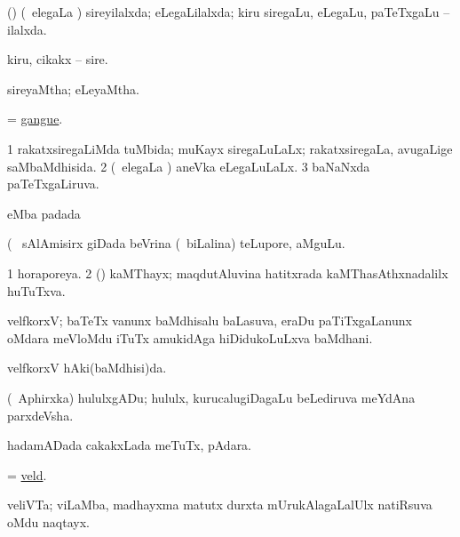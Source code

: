 \bentry
{} 
\gl{\gu}
\expl{}
\bmng
 (\savi) (\kanmu\ elegaLa \vi) sireyilalxda; eLegaLilalxda; kiru siregaLu, eLegaLu, paTeTxgaLu -- ilalxda. 
\emng
\eentry

\bentry
{} 
\gl{\nA}
\expl{}
\bmng
 kiru, cikakx -- sire. 
\emng
\eentry

\bentry
{} 
\gl{\gu}
\expl{}
\bmng
 sireyaMtha; eLeyaMtha. 
\emng
\eentry

\bentry
{} 
\gl{\nA}
\expl{}
\bmng
 = \hyperref{kandict_g.pdf}{G}{gangue}{gangue}. 
\emng
\eentry

\bentry
{} 
\gl{\gu}
\bmng
\bnum
\num{1} rakatxsiregaLiMda tuMbida; muKayx siregaLuLaLx; rakatxsiregaLa, avugaLige saMbaMdhisida. 
\num{2} (\kanmu\ elegaLa \vi) aneVka eLegaLuLaLx. 
\num{3} baNaNxda paTeTxgaLiruva. 
\enum
\emng
\eentry

\bentry
{} 
\gl{\nA}
\expl{}
\bmng
  eMba padada \bava 
\emng
\eentry

\bentry
{} 
\gl{\nA}(\bava\ 
\bmng
 sAlAmisirx giDada beVrina (\kanmu\ biLalina) teLupore, aMguLu. 
\emng
\eentry

\bentry
{} 
\gl{\gu}
\expl{}
\bmng
\bnum
\num{1} horaporeya. 
\num{2} (\dhavxni) kaMThayx; maqdutAluvina hatitxrada kaMThasAthxnadalilx huTuTxva. 
\enum
\emng
\eentry

\bentry
{} 
\gl{\nA}
\expl{(\P)}
\bmng
 velfkorxV; baTeTx \mo vanunx baMdhisalu baLasuva, eraDu paTiTxgaLanunx oMdara meVloMdu iTuTx amukidAga hiDidukoLuLxva baMdhani. 
\emng
\eentry

\bentry
{} 
\gl{\gu}
\expl{}
\bmng
 velfkorxV hAki(baMdhisi)da. 
\emng
\eentry

\bentry
{} 
\gl{\nA}
\expl{}
\bmng
 (\da\ Aphirxka) hululxgADu; hululx, kurucalugiDagaLu beLediruva meYdAna parxdeVsha. 
\emng
\eentry

\bentry
{} 
\gl{\nA}
\expl{}
\bmng
hadamADada cakakxLada meTuTx, pAdara. 
\emng
\eentry

\bentry
{} 
\gl{\nA}
\expl{}
\bmng
 = \hyperlink{veld}{veld}. 
\emng
\eentry

\bentry
{} 
\gl{\nA}
\expl{}
\bmng
 veliVTa; viLaMba, madhayxma matutx durxta mUrukAlagaLalUlx natiRsuva oMdu naqtayx. 
\emng
\eentry

